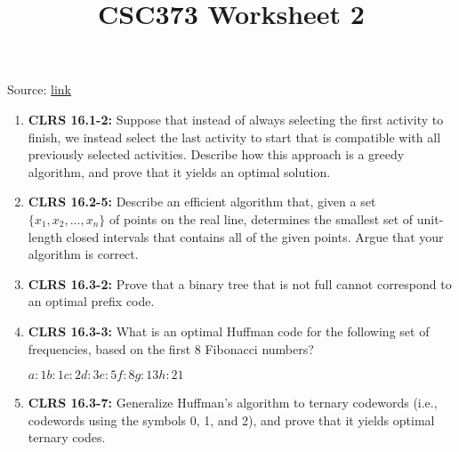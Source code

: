 \documentclass[12pt]{article}
\begin{document}
\title{CSC373 Worksheet 2}
\maketitle

\bigskip

Source: \href{http://www.cs.toronto.edu/~denisp/csc373/material.html}{link}

\begin{enumerate}[1.]
    \item \textbf{CLRS 16.1-2:} Suppose that instead of always selecting the first activity to finish, we instead select
    the last activity to start that is compatible with all previously selected activities. Describe
    how this approach is a greedy algorithm, and prove that it yields an optimal
    solution.

    \item \textbf{CLRS 16.2-5:} Describe an efficient algorithm that, given a set $\{x_1, x_2, ..., x_n\}$ of points on the
    real line, determines the smallest set of unit-length closed intervals that contains
    all of the given points. Argue that your algorithm is correct.

    \item \textbf{CLRS 16.3-2:} Prove that a binary tree that is not full cannot correspond to an optimal prefix code.

    \item \textbf{CLRS 16.3-3:} What is an optimal Huffman code for the following set of frequencies, based on
    the first 8 Fibonacci numbers?

    \bigskip

    $a:1 b:1 c:2 d:3 e:5 f:8 g:13 h:21$

    \item \textbf{CLRS 16.3-7:} Generalize Huffman’s algorithm to ternary codewords (i.e., codewords using the
    symbols 0, 1, and 2), and prove that it yields optimal ternary codes.
\end{enumerate}
\end{document}
